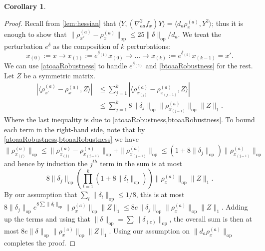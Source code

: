 \documentclass[aos]{imsart}
\newtheorem{corollary}[theorem]{Corollary}
\theoremstyle{definition}
\numberwithin{equation}{section}
\DeclareMathOperator{\op}{op}
\newcommand{\samp}{x}
\newcommand{\CF}[1]{{\color{purple}[CF: #1]}}
\newcommand{\CF}[1]{{}}
\begin{document}
\begin{appendix}
\begin{corollary}
\end{corollary}
\begin{proof}
Recall from \cref{lem:hessian} that $\langle Y, (\nabla^{2}_{aa} f_{\samp}) Y \rangle = \langle d_{a} \rho_{\samp}^{(a)}, Y^{2} \rangle$; thus it is enough to show that $\|\rho_{\samp'}^{(a)} - \rho_{\samp}^{(a)}\|_{\op} \leq 25 \|\delta\|_{\op} /d_a$. We treat the perturbation $e^\delta$ as the composition of $k$ perturbations:
\[ \samp_{(0)}:=\samp \to \samp_{(1)}:= e^{\delta_{(1)}} \samp_{(0)} \to ... \to \samp_{(k)}:=e^{\delta_{(k)}} \samp_{(k-1)} = \samp'. \]
We can use \cref{atoaaRobustness} to handle $e^{\delta_{(a)}}$ and \cref{btoaaRobustness} for the rest. Let $Z$ be a symmetric matrix.
\begin{align*}
 |\langle \rho_{\samp'}^{(a)} - \rho_{\samp}^{(a)}, Z \rangle|
 &\leq \sum_{j=1}^{k} |\langle \rho_{\samp_{(j)}}^{(a)} - \rho_{\samp_{(j-1)}}^{(a)}, Z \rangle| \\
 &\leq \sum_{j=1}^{k}  8 \|\delta_{j}\|_{\op} \|\rho_{\samp_{(j-1)}}^{(a)}\|_{\op} \|Z\|_{1}.
\end{align*}
Where the last inequality is due to \cref{atoaaRobustness,btoaaRobustness}.
To bound each term in the right-hand side, note that by \cref{atoaaRobustness,btoaaRobustness} we have
$$\|\rho_{\samp_{(j)}}^{(a)}\|_{\op} \leq \|\rho_{\samp_{(j)}}^{(a)} - \rho_{\samp_{(j-1)}}^{(a)}\|_{\op} + \|\rho_{\samp_{(j-1)}}^{(a)}\|_{\op} \leq   (1+8 \|\delta_{j}\|_{\op})\|\rho_{\samp_{(j-1)}}^{(a)}\|_{\op}$$
and hence by induction the $j^{th}$ term in the sum is at most $$8 \|\delta_j\|_{\op} \left( \prod_{l=1}^k (1+8 \|\delta_{l}\|_{\op}) \right) \|\rho_{\samp}^{(a)}\|_{\op} \|Z\|_{1}.$$ By our assumption that $\sum_l \|\delta_l\|_{\op} \leq 1/8$, this is at most $8 \|\delta_j\|_{\op} e^{8 \sum \|\delta_l\|_{\op}} \|\rho_{\samp}^{(a)}\|_{\op} \|Z\|_{1} \leq 8e \|\delta_j\|_{\op} \|\rho_{\samp}^{(a)}\|_{\op} \|Z\|_{1}. $ Adding up the terms and using that $\|\delta\|_{\op} = \sum \|\delta_{(c)}\|_{\op}$, the overall sum is then at most $8 e \|\delta\|_{\op} \|\rho_{\samp}^{(a)}\|_{\op} \|Z\|_{1}$. Using our assumption on $\|d_{a} \rho_{\samp}^{(a)}\|_{\op}$ completes the proof.
\end{proof}


\end{appendix}
\end{document}
